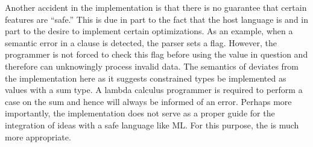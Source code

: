 
Another accident in the
\pads{} implementation is that there is no guarantee that
certain features are ``safe.''  This is due in part to the fact that
the \pads{} host language is \C{} and in part to the desire to implement
certain optimizations.  As an example, when a 
semantic error in a \Pwhere{} clause is detected, the parser sets a flag.  
However, the \C{} programmer is not forced to check this flag before using 
the value in question and therefore can unknowingly process invalid data.  The 
semantics of \ddc{} deviates from the \C{} implementation here as it suggests
constrained types be implemented as values with a sum type.  A lambda
calculus programmer is required to perform a case on the sum and
hence will always be informed of an error.
Perhaps more importantly, the \C{} implementation does not serve as a
proper guide for the integration of \pads{} ideas with a safe language like ML.
For this purpose, the \ddc{} is much more appropriate.






